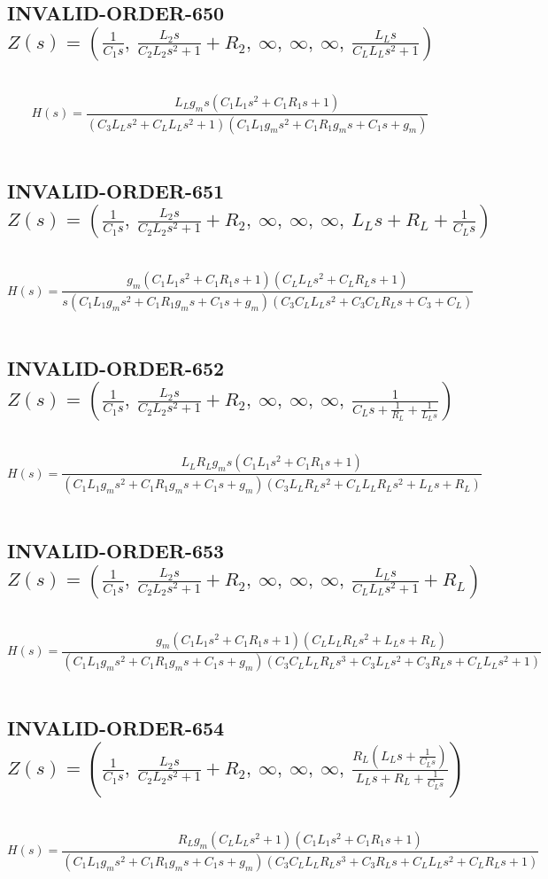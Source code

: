 \documentclass{article}
\begin{document}
\subsection{INVALID-ORDER-650 $Z(s) = \left( \frac{1}{C_{1} s}, \  \frac{L_{2} s}{C_{2} L_{2} s^{2} + 1} + R_{2}, \  \infty, \  \infty, \  \infty, \  \frac{L_{L} s}{C_{L} L_{L} s^{2} + 1}\right)$ } \ 
\textbf{\[H(s) = \frac{L_{L} g_{m} s \left(C_{1} L_{1} s^{2} + C_{1} R_{1} s + 1\right)}{\left(C_{3} L_{L} s^{2} + C_{L} L_{L} s^{2} + 1\right) \left(C_{1} L_{1} g_{m} s^{2} + C_{1} R_{1} g_{m} s + C_{1} s + g_{m}\right)}\] } \ 
\subsection{INVALID-ORDER-651 $Z(s) = \left( \frac{1}{C_{1} s}, \  \frac{L_{2} s}{C_{2} L_{2} s^{2} + 1} + R_{2}, \  \infty, \  \infty, \  \infty, \  L_{L} s + R_{L} + \frac{1}{C_{L} s}\right)$ } \ 
\textbf{\[H(s) = \frac{g_{m} \left(C_{1} L_{1} s^{2} + C_{1} R_{1} s + 1\right) \left(C_{L} L_{L} s^{2} + C_{L} R_{L} s + 1\right)}{s \left(C_{1} L_{1} g_{m} s^{2} + C_{1} R_{1} g_{m} s + C_{1} s + g_{m}\right) \left(C_{3} C_{L} L_{L} s^{2} + C_{3} C_{L} R_{L} s + C_{3} + C_{L}\right)}\] } \ 
\subsection{INVALID-ORDER-652 $Z(s) = \left( \frac{1}{C_{1} s}, \  \frac{L_{2} s}{C_{2} L_{2} s^{2} + 1} + R_{2}, \  \infty, \  \infty, \  \infty, \  \frac{1}{C_{L} s + \frac{1}{R_{L}} + \frac{1}{L_{L} s}}\right)$ } \ 
\textbf{\[H(s) = \frac{L_{L} R_{L} g_{m} s \left(C_{1} L_{1} s^{2} + C_{1} R_{1} s + 1\right)}{\left(C_{1} L_{1} g_{m} s^{2} + C_{1} R_{1} g_{m} s + C_{1} s + g_{m}\right) \left(C_{3} L_{L} R_{L} s^{2} + C_{L} L_{L} R_{L} s^{2} + L_{L} s + R_{L}\right)}\] } \ 
\subsection{INVALID-ORDER-653 $Z(s) = \left( \frac{1}{C_{1} s}, \  \frac{L_{2} s}{C_{2} L_{2} s^{2} + 1} + R_{2}, \  \infty, \  \infty, \  \infty, \  \frac{L_{L} s}{C_{L} L_{L} s^{2} + 1} + R_{L}\right)$ } \ 
\textbf{\[H(s) = \frac{g_{m} \left(C_{1} L_{1} s^{2} + C_{1} R_{1} s + 1\right) \left(C_{L} L_{L} R_{L} s^{2} + L_{L} s + R_{L}\right)}{\left(C_{1} L_{1} g_{m} s^{2} + C_{1} R_{1} g_{m} s + C_{1} s + g_{m}\right) \left(C_{3} C_{L} L_{L} R_{L} s^{3} + C_{3} L_{L} s^{2} + C_{3} R_{L} s + C_{L} L_{L} s^{2} + 1\right)}\] } \ 
\subsection{INVALID-ORDER-654 $Z(s) = \left( \frac{1}{C_{1} s}, \  \frac{L_{2} s}{C_{2} L_{2} s^{2} + 1} + R_{2}, \  \infty, \  \infty, \  \infty, \  \frac{R_{L} \left(L_{L} s + \frac{1}{C_{L} s}\right)}{L_{L} s + R_{L} + \frac{1}{C_{L} s}}\right)$ } \ 
\textbf{\[H(s) = \frac{R_{L} g_{m} \left(C_{L} L_{L} s^{2} + 1\right) \left(C_{1} L_{1} s^{2} + C_{1} R_{1} s + 1\right)}{\left(C_{1} L_{1} g_{m} s^{2} + C_{1} R_{1} g_{m} s + C_{1} s + g_{m}\right) \left(C_{3} C_{L} L_{L} R_{L} s^{3} + C_{3} R_{L} s + C_{L} L_{L} s^{2} + C_{L} R_{L} s + 1\right)}\] } \ 
\end{document}
